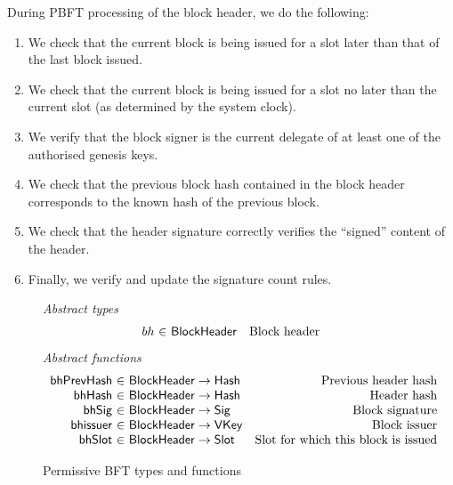\documentclass[11pt,a4paper]{article}
\newcommand{\fun}[1]{\mathsf{#1}}
\newcommand{\type}[1]{\mathsf{#1}}
\newcommand{\totalf}{\to}
\newcommand{\Hash}{\type{Hash}}  %
\newcommand{\Slot}{\type{Slot}}
\newcommand{\VKey}{\type{VKey}}
\newcommand{\Sig}{\type{Sig}}
\newcommand{\bhsigname}{bhSig}
\newcommand{\bhissuername}{bhissuer}
\begin{document}
During PBFT processing of the block header, we do the following:
\begin{enumerate}
 \item We check that the current block is being issued for a slot later than
    that of the last block issued.
  \item We check that the current block is being issued for a slot no later than
    the current slot (as determined by the system clock).
  \item We verify that the block signer is the current delegate of at least one
    of the authorised genesis keys.
  \item We check that the previous block hash contained in the block header
    corresponds to the known hash of the previous block.
  \item We check that the header signature correctly verifies the ``signed''
    content of the header.
  \item Finally, we verify and update the signature count rules.
  \end{enumerate}
  \begin{figure}[ht]
  \emph{Abstract types}
  \begin{equation*}
    \begin{array}{r@{~\in~}lr}
      bh & \Bhead & \text{Block header}
    \end{array}
  \end{equation*}
  \emph{Abstract functions}
  \begin{equation*}
    \begin{array}{r@{~\in~}lr}
      \fun{\bhprevhashname} & \Bhead \totalf \Hash & \text{Previous header hash} \\
      \fun{\bhhashname} & \Bhead \totalf \Hash & \text{Header hash} \\
      \fun{\bhsigname} & \Bhead \totalf \Sig & \text{Block signature} \\
      \fun{\bhissuername} & \Bhead \totalf \VKey & \text{Block issuer} \\
      \fun{\bhslotname} & \Bhead \totalf \Slot & \text{Slot for which this block is issued}
    \end{array}
  \end{equation*}
  \caption{Permissive BFT types and functions}
  \label{fig:defs:pbft}
\end{figure}
\end{document}
